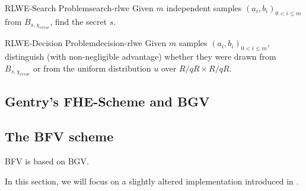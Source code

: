 \begin{corollary}{RLWE-Search Problem}{search-rlwe}
  Given $m$ independent samples $(a_i, b_i)_{0 < i \leq m}$ from $B_{s, \chi_{error}}$, find the secret $s$.
\end{corollary}
\begin{corollary}{RLWE-Decision Problem}{decision-rlwe}
  Given $m$ samples $(a_i, b_i)_{0 < i \leq m}$, distinguish (with non-negligible advantage)
  whether they were drawn from $B_{s, \chi_{error}}$ or from the uniform distribution
  $u$ over $R/qR \times R/qR$.
\end{corollary}

\subsection{Gentry's FHE-Scheme and BGV}
\cite{2009-gentry-fhe-original}

\pagebreak
\subsection{The BFV scheme}
\cite{2012-fv-original}
\cite{2012-brakerski}
BFV is based on BGV.

In this section, we will focus on a slightly altered implementation introduced in \cite{2014-fv-comparison}.

